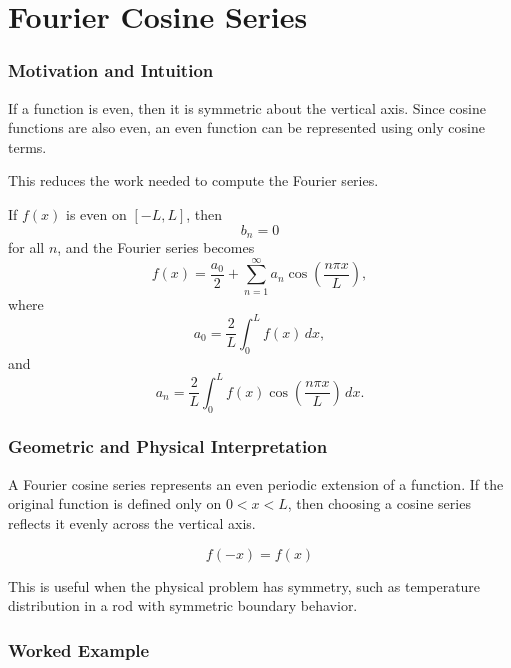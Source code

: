 \section{Fourier Cosine Series}

\subsubsection*{Motivation and Intuition}

If a function is even, then it is symmetric about the vertical axis. Since cosine functions are also even, an even function can be represented using only cosine terms.

This reduces the work needed to compute the Fourier series.

\begin{conceptbox}
    If $f(x)$ is even on $[-L,L]$, then
    \[
        b_n=0
    \]
    for all $n$, and the Fourier series becomes
    \[
        f(x)=\frac{a_0}{2}+\sum_{n=1}^{\infty}
        a_n\cos\left(\frac{n\pi x}{L}\right),
    \]
    where
    \[
        a_0=\frac{2}{L}\int_0^L f(x)\,dx,
    \]
    and
    \[
        a_n=\frac{2}{L}\int_0^L
        f(x)\cos\left(\frac{n\pi x}{L}\right)\,dx.
    \]
\end{conceptbox}

\subsubsection*{Geometric and Physical Interpretation}

A Fourier cosine series represents an even periodic extension of a function. If the original function is defined only on $0<x<L$, then choosing a cosine series reflects it evenly across the vertical axis.

\[
    f(-x)=f(x)
\]

This is useful when the physical problem has symmetry, such as temperature distribution in a rod with symmetric boundary behavior.

\subsubsection*{Worked Example}

